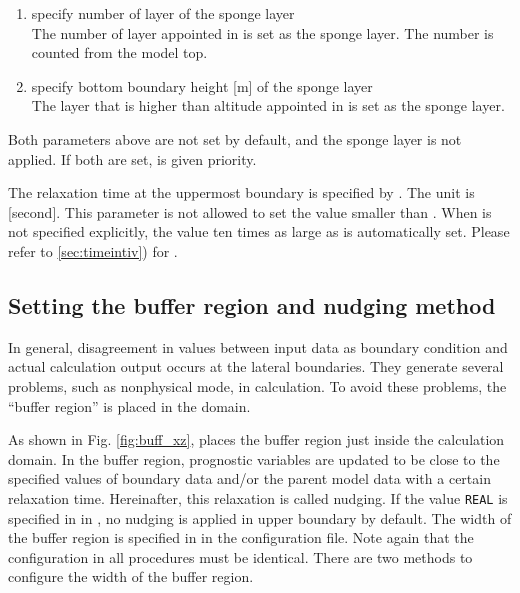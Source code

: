 \begin{enumerate}
\item specify number of layer of the sponge layer \\
  The number of layer appointed in  is set as the sponge layer. The number is counted from the model top.
\item specify bottom boundary height [m] of the sponge layer \\
  The layer that is higher than altitude appointed in  is set as the sponge layer.
\end{enumerate}

Both parameters above are not set by default, and the sponge layer is not applied. If both are set,  is given priority.

The relaxation time at the uppermost boundary is specified by . The unit is [second]. This parameter is not allowed to set the value smaller than . When  is not specified explicitly, the value ten times as large as  is automatically set. Please refer to \ref{sec:timeintiv}) for .

\subsection{Setting the buffer region and nudging method} \label{subsec:buffer}

In general, disagreement in values between input data as boundary condition and actual calculation output occurs at the lateral boundaries. They generate several problems, such as nonphysical mode, in calculation.
To avoid these problems, the ``buffer region'' is placed in the domain.

As shown in Fig. \ref{fig:buff_xz}, \scalerm places the buffer region just inside the calculation domain. In the buffer region, prognostic variables are updated to be close to the specified values of boundary data and/or the parent model data with a certain relaxation time. Hereinafter, this relaxation is called nudging.
If the value \verb|REAL| is specified in  in , no nudging is applied in upper boundary by default.
The width of the buffer region is specified in  in the configuration file. Note again that the configuration in all procedures must be identical. There are two methods to configure the width of the buffer region.

